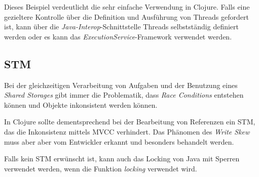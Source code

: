 Dieses Beispiel verdeutlicht die sehr einfache Verwendung in Clojure. Falls eine gezieltere Kontrolle über die Definition und Ausführung von Threads gefordert ist, kann über die \textit{Java-Interop}-Schnittstelle Threads selbstständig definiert werden oder es kann das \textit{ExecutionService}-Framework verwendet werden.

\subsection*{\acl{STM}}
Bei der gleichzeitigen Verarbeitung von Aufgaben und der Benutzung eines \textit{Shared Storages} gibt immer die Problematik, dass \textit{Race Conditions} entstehen können und Objekte inkonsistent werden können.

In Clojure sollte dementsprechend bei der Bearbeitung von Referenzen ein \acf{STM}, das die Inkonsistenz mittels \ac{MVCC} verhindert. Das Phänomen des \textit{Write Skew} muss aber aber vom Entwickler erkannt und besonders behandelt werden.

Falls kein \ac{STM} erwünscht ist, kann auch das Locking von Java mit Sperren verwendet werden, wenn die Funktion \textit{locking} verwendet wird.
